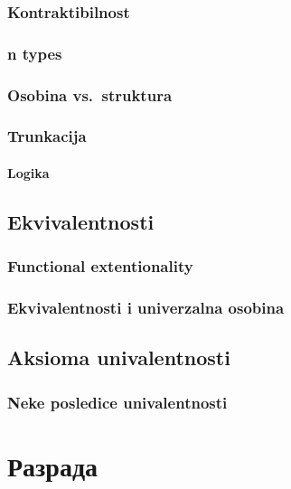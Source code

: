 \documentclass[12pt,oneside]{memoir}
\begin{document}
\subsection{Kontraktibilnost}

\subsection{n types}

\subsection{Osobina vs.~struktura}

\subsection{Trunkacija}

\subsubsection{Logika}

\section{Ekvivalentnosti}

\subsection{Functional extentionality}

\subsection{Ekvivalentnosti i univerzalna osobina}

\section{Aksioma univalentnosti}

\subsection{Neke posledice univalentnosti}

\chapter{Разрада}
\label{chp:razrada}
\end{document}
